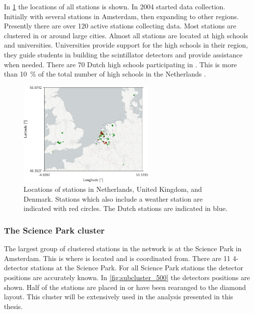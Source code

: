 In \cref{fig:network_weather_knmi} the locations of all \hisparc stations is shown. In 2004 \hisparc started data collection. Initially with several stations in Amsterdam, then expanding to other regions. Presently there are over \num{120} active \hisparc stations collecting data. Most stations are clustered in or around large cities. Almost all stations are located at high schools and universities. Universities provide support for the high schools in their region, they guide students in building the scintillator detectors and provide assistance when needed. There are \num{70} Dutch high schools participating in \hisparc. This is more than \SI{10}{\percent} of the total number of high schools in the Netherlands \cite{duo2016hoofd}.

\begin{figure}
    \centering
    \includegraphics[width=0.6\textwidth]
                    {plots/cluster/network_weather_knmi}
    \caption{Locations of \hisparc stations in Netherlands, United Kingdom, and Denmark. Stations which also include a weather station are indicated with red circles. The Dutch \knmi stations are indicated in blue.}
    \label{fig:network_weather_knmi}
\end{figure}


\subsubsection{The Science Park cluster}

The largest group of clustered stations in the \hisparc network is at the Science Park in Amsterdam. This is where \nikhef is located and \hisparc is coordinated from. There are 11 4-detector stations at the Science Park. For all Science Park stations the detector positions are accurately known. In \cref{fig:subcluster_500} the detectors positions are shown. Half of the stations are placed in or have been rearanged to the diamond layout. This cluster will be extensively used in the analysis presented in this thesis.

